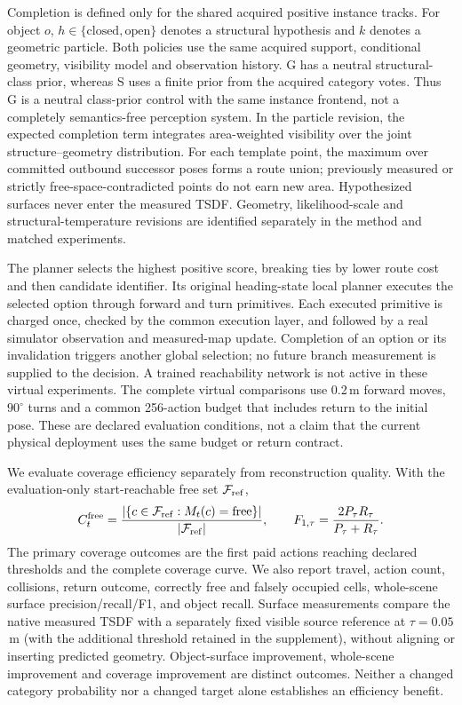 Completion is defined only for the shared acquired positive instance tracks. For object $o$, $h\in\{\text{closed},\text{open}\}$ denotes a structural hypothesis and $k$ denotes a geometric particle. Both policies use the same acquired support, conditional geometry, visibility model and observation history. G has a neutral structural-class prior, whereas S uses a finite prior from the acquired category votes. Thus G is a neutral class-prior control with the same instance frontend, not a completely semantics-free perception system. In the particle revision, the expected completion term integrates area-weighted visibility over the joint structure--geometry distribution. For each template point, the maximum over committed outbound successor poses forms a route union; previously measured or strictly free-space-contradicted points do not earn new area. Hypothesized surfaces never enter the measured TSDF. Geometry, likelihood-scale and structural-temperature revisions are identified separately in the method and matched experiments.

The planner selects the highest positive score, breaking ties by lower route cost and then candidate identifier. Its original heading-state local planner executes the selected option through forward and turn primitives. Each executed primitive is charged once, checked by the common execution layer, and followed by a real simulator observation and measured-map update. Completion of an option or its invalidation triggers another global selection; no future branch measurement is supplied to the decision. A trained reachability network is not active in these virtual experiments. The complete virtual comparisons use 0.2\,m forward moves, $90^{\circ}$ turns and a common 256-action budget that includes return to the initial pose. These are declared evaluation conditions, not a claim that the current physical deployment uses the same budget or return contract.

We evaluate coverage efficiency separately from reconstruction quality. With the evaluation-only start-reachable free set $\mathcal F_{\rm ref}$,
\begin{equation}
C_t^{\rm free}=\frac{|\{c\in\mathcal F_{\rm ref}:M_t(c)=\text{free}\}|}{|\mathcal F_{\rm ref}|},\qquad
F_{1,\tau}=\frac{2P_\tau R_\tau}{P_\tau+R_\tau}.
\end{equation}
The primary coverage outcomes are the first paid actions reaching declared thresholds and the complete coverage curve. We also report travel, action count, collisions, return outcome, correctly free and falsely occupied cells, whole-scene surface precision/recall/F1, and object recall. Surface measurements compare the native measured TSDF with a separately fixed visible source reference at $\tau=0.05$\,m (with the additional threshold retained in the supplement), without aligning or inserting predicted geometry. Object-surface improvement, whole-scene improvement and coverage improvement are distinct outcomes. Neither a changed category probability nor a changed target alone establishes an efficiency benefit.

